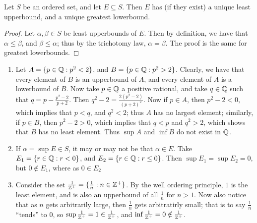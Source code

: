 \begin{lemma}\label{1.1.1}
    Let $S$ be an ordered set, and let $E \subseteq S$. Then  $E$ has (if they exist) a 
    unique least upperbound, and a unique greatest lowerbound.
\end{lemma}
\begin{proof}
    Let $\alpha, \beta \in S$ be least upperbounds of $E$. Then by definition, we have that 
    $\alpha \leq \beta$, and  $\beta \leq \alpha$; thus by the trichotomy law,  $\alpha=\beta$. The proof is the same 
    for greatest lowerbounds.
\end{proof}

\begin{example}
    \begin{enumerate}[label=(\arabic*)]
        \item Let $A=\{p \in \mathbb{Q}: p^2<2\}$, and $B=\{p \in \mathbb{Q}: p^2>2\}$. Clearly, we 
            have that every element of $B$ is an upperbound of $A$, and every element of 
             $A$ is a lowerbound of  $B$. Now take  $p \in \mathbb{Q}$ a positive rational, and 
             take  $q \in \mathbb{Q}$ such that $q=p-\frac{p^2-2}{p+2}$. Then $q^2-2=\frac{2(p^2-2)}{(p+2)^2}$. 
             Now if $p \in A$, then  $p^2-2<0$, which implies that  $p<q$, and $q^2<2$; thus 
             $A$ has no largest element; similarly, if  $p \in B$, then  $p^2-2>0$, which 
             implies that  $q<p$ and  $q^2>2$, which shows that  $B$ has no least element. Thus 
             $\sup{A}$ and  $\inf{B}$ do not exist in $\mathbb{Q}$. 

         \item If  $\alpha = \sup{E} \in S$, it may or may not be that  $\alpha \in E$. Take 
             $E_1=\{r \in \mathbb{Q}: r<0\}$, and  $E_2=\{r \in \mathbb{Q}: r \leq 0\}$. Then $\sup{E_1}=
             \sup{E_2}=0$, but $0 \notin E_1$, where as $0 \in E_2$

         \item Consider the set $ \frac{1}{\mathbb{Z}^+}=\{\frac{1}{n}: n \in \mathbb{Z}^+\}$. By the 
             well ordering principle, $1$ is the least element, and is also an upperbound 
             of all  $ \frac{1}{n}$ for $n>1$. Now also notice that as $n$ gets arbitrarily 
             large, then  $ \frac{1}{n}$ gets arbitratirly small; that is to say $\frac{1}{n}$ 
             ``tends'' to $0$, so  $\sup{\frac{1}{\mathbb{Z}^+}}=1 \in \frac{1}{\mathbb{Z}^+}$, and 
             $\inf{\frac{1}{\mathbb{Z}^+}}=0 \notin \frac{1}{\mathbb{Z}^+}$.
    \end{enumerate}		
\end{example} 

